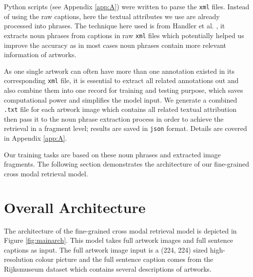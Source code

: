 Python scripts (see Appendix \ref{app:A}) were written to parse the \verb|xml| files. Instead of using the raw captions, here the textual attributes we use are already processed into phrases. The technique here used is from Handler et al. \cite{nounphrase}, it extracts noun phrases from captions in raw \verb|xml| files which potentially helped us improve the accuracy as in most cases noun phrases contain more relevant information of artworks.  

As one single artwork can often have more than one annotation existed in its corresponding \verb|xml| file, it is essential to extract all related annotations out and also combine them into one record for training and testing purpose, which saves computational power and simplifies the model input. We generate a combined \verb|.txt| file for each artwork image which contains all related textual attribution then pass it to the noun phrase extraction process in order to achieve the retrieval in a fragment level; results are saved in \verb|json| format. Details are covered in Appendix \ref{app:A}.



Our training tasks are based on these noun phrases and extracted image fragments. The following section demonstrates the architecture of our fine-grained cross modal retrieval model.

\section{Overall Architecture}

The architecture of the fine-grained cross modal retrieval model is depicted in Figure \ref{fig:mainarch}. This model takes full artwork images and full sentence captions as input. The full artwork image input is a (224, 224) sized high-resolution colour picture and the full sentence caption comes from the Rijksmuseum dataset \cite{MensinkICMIR2014} which contains several descriptions of artworks.

